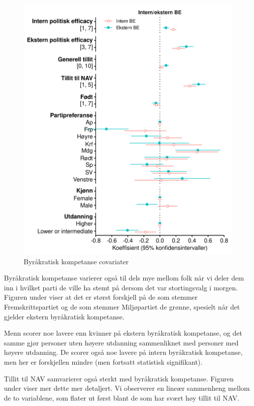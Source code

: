 \documentclass[
  12pt,
  a4paper, 12pt]{article}
\begin{document}
\begin{figure}

{\centering \includegraphics[width=0.8\linewidth]{figs/png/fig_be_coefs_by_type} 

}

\caption{Byråkratisk kompetanse covariater}\label{fig:unnamed-chunk-10}
\end{figure}

Byråkratisk kompetanse varierer også til dels mye mellom folk når vi deler dem inn i hvilket parti de ville ha stemt på dersom det var stortingsvalg i morgen.
Figuren under viser at det er størst forskjell på de som stemmer Fremskrittspartiet og de som stemmer Miljøpartiet de grønne, spesielt når det gjelder ekstern byråkratisk kompetanse.

Menn scorer noe lavere enn kvinner på ekstern byråkratisk kompetanse, og det samme gjør personer uten høyere utdanning sammenliknet med personer med høyere utdanning.
De scorer også noe lavere på intern byråkratisk kompetanse, men her er forskjellen mindre (men fortsatt statistisk signifikant).

Tillit til NAV samvarierer også sterkt med byråkratisk kompetanse.
Figuren under viser mer dette mer detaljert.
Vi observerer en lineær sammenheng mellom de to variablene, som flater ut først blant de som har svært høy tillit til NAV.
\end{document}
